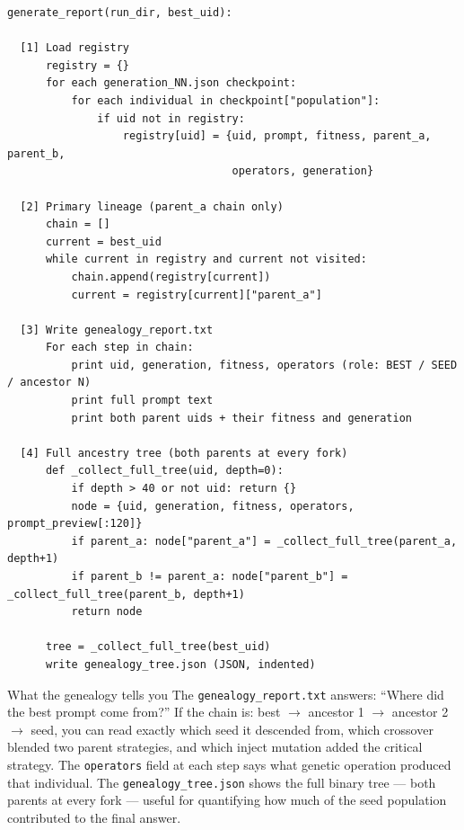 \documentclass[11pt,a4paper]{report}
\newcommand{\fn}[1]{\texttt{#1}}
\begin{document}
\begin{lstlisting}[style=chain]
generate_report(run_dir, best_uid):

  [1] Load registry
      registry = {}
      for each generation_NN.json checkpoint:
          for each individual in checkpoint["population"]:
              if uid not in registry:
                  registry[uid] = {uid, prompt, fitness, parent_a, parent_b,
                                   operators, generation}

  [2] Primary lineage (parent_a chain only)
      chain = []
      current = best_uid
      while current in registry and current not visited:
          chain.append(registry[current])
          current = registry[current]["parent_a"]

  [3] Write genealogy_report.txt
      For each step in chain:
          print uid, generation, fitness, operators (role: BEST / SEED / ancestor N)
          print full prompt text
          print both parent uids + their fitness and generation

  [4] Full ancestry tree (both parents at every fork)
      def _collect_full_tree(uid, depth=0):
          if depth > 40 or not uid: return {}
          node = {uid, generation, fitness, operators, prompt_preview[:120]}
          if parent_a: node["parent_a"] = _collect_full_tree(parent_a, depth+1)
          if parent_b != parent_a: node["parent_b"] = _collect_full_tree(parent_b, depth+1)
          return node

      tree = _collect_full_tree(best_uid)
      write genealogy_tree.json (JSON, indented)
\end{lstlisting}

\begin{conceptbox}{What the genealogy tells you}
The \fn{genealogy\_report.txt} answers: ``Where did the best prompt come from?''
If the chain is: best $\to$ ancestor 1 $\to$ ancestor 2 $\to$ seed,
you can read exactly which seed it descended from, which crossover blended two parent
strategies, and which inject mutation added the critical strategy.  The \fn{operators}
field at each step says what genetic operation produced that individual.
The \fn{genealogy\_tree.json} shows the full binary tree --- both parents at every fork
--- useful for quantifying how much of the seed population contributed to the final answer.
\end{conceptbox}


\end{document}
